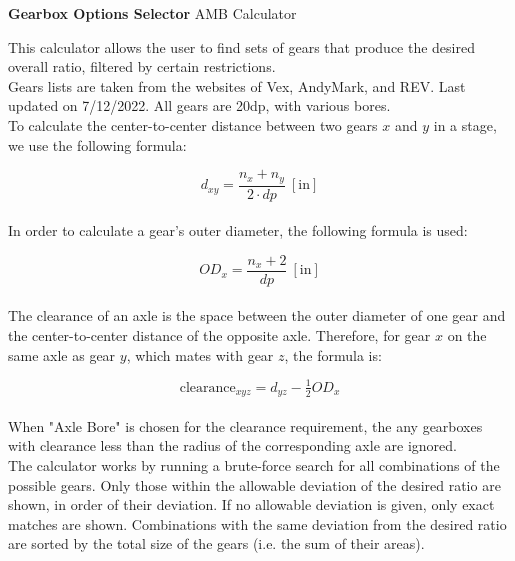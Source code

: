 \documentclass[a4paper]{article}
\begin{document}
	
	\Huge\textbf{Gearbox Options Selector}
	\newline
	\LARGE AMB Calculator
	
	\vspace{0.5cm}
	\normalsize
	
	This calculator allows the user to find sets of gears that produce the desired overall ratio, filtered by certain restrictions.\\
	
	Gears lists are taken from the websites of Vex, AndyMark, and REV. Last updated on 7/12/2022. All gears are 20dp, with various bores.\\
	
	To calculate the center-to-center distance between two gears $ x $ and $ y $ in a stage, we use the following formula:
	
	\begin{equation}
		d_{xy} = \frac{n_x + n_y}{2 \cdot dp}\ \left[ \text{in} \right]
	\end{equation}
	\\
	In order to calculate a gear's outer diameter, the following formula is used:
	
	\begin{equation}
		OD_x = \frac{n_x + 2}{dp}\ \left[ \text{in} \right]
	\end{equation}
	\\
	The clearance of an axle is the space between the outer diameter of one gear and the center-to-center distance of the opposite axle. Therefore, for gear $ x $ on the same axle as gear $ y $, which mates with gear $ z $, the formula is:
	
	\begin{equation}
		\text{clearance}_{xyz} = d_{yz} - \tfrac{1}{2} OD_x
	\end{equation}
	\\
	When "Axle Bore" is chosen for the clearance requirement, the any gearboxes with clearance less than the radius of the corresponding axle are ignored.\\
	
	The calculator works by running a brute-force search for all combinations of the possible gears. Only those within the allowable deviation of the desired ratio are shown, in order of their deviation. If no allowable deviation is given, only exact matches are shown. Combinations with the same deviation from the desired ratio are sorted by the total size of the gears (i.e. the sum of their areas).
	
	
	\newpage
\end{document}

